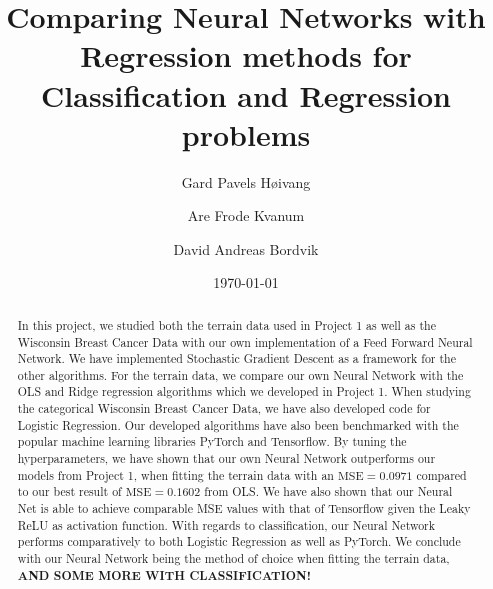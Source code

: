 \documentclass
[twocolumn,
secnumarabic,
nobibnotes,
aps,
prl,
reprint,
groupedaddress,
amsmath,
amssymb
]{revtex4-2}
\begin{document}

\title{Comparing Neural Networks with Regression methods for Classification and Regression problems}

\author{Gard Pavels Høivang}
\author{Are Frode Kvanum}
\author{David Andreas Bordvik}
\date{\today}

\begin{abstract}
    In this project, we studied both the terrain data used in Project 1 as well as the Wisconsin Breast Cancer Data with our own implementation of a Feed Forward Neural Network. We have implemented Stochastic Gradient Descent as a framework for the other algorithms. For the terrain data, we compare our own Neural Network with the OLS and Ridge regression algorithms which we developed in Project 1. When studying the categorical Wisconsin Breast Cancer Data, we have also developed code for Logistic Regression. Our developed algorithms have also been benchmarked with the popular machine learning libraries PyTorch and Tensorflow. By tuning the hyperparameters, we have shown that our own Neural Network outperforms our models from Project 1, when fitting the terrain data with an $\text{MSE} = 0.0971$ compared to our best result of $\text{MSE} = 0.1602$ from OLS. We have also shown that our Neural Net is able to achieve comparable MSE values with that of Tensorflow given the Leaky ReLU as activation function. With regards to classification, our Neural Network performs comparatively to both Logistic Regression as well as PyTorch. We conclude with our Neural Network being the method of choice when fitting the terrain data, \textbf{AND SOME MORE WITH CLASSIFICATION!}
\end{abstract}

\maketitle
\end{document}
